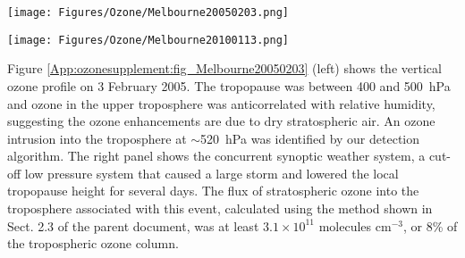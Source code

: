  \begin{figure*}[t]
    \texttt{[image: Figures/Ozone/Melbourne20050203.png]}
    \caption{(Left) Vertical profile of ozone (black), relative humidity (blue), and temperature (red) measured by ozonesonde over Melbourne on 3 February 2005.
      The detected ozone STT event is highlighted in pink.
      Tropopause heights using both the ozone definition (black dashed line) and lapse rate definition (red dashed line) are also shown.
      (Right) Geopotential heights at 500~hPa from the ERA-Interim reanalysis, with wind vectors over-plotted.
      Also shown is the 1~PVU contour line (purple).}
    \label{App:ozonesupplement:fig_Melbourne20050203}
  \end{figure*}
  
  \begin{figure*}[t]
    \texttt{[image: Figures/Ozone/Melbourne20100113.png]}
    \caption{Same as Fig. \ref{App:ozonesupplement:fig_Melbourne20050203} but for 13 January 2010.
      Also shown in this figure is the 2 PVU contour (white), often used to determine dynamical tropopause height.}
    \label{App:ozonesupplement:fig_Melbourne20100113}
  \end{figure*}
  
  Figure \ref{App:ozonesupplement:fig_Melbourne20050203} (left) shows the vertical ozone profile on 3 February 2005.
  The tropopause was between 400 and 500~hPa and ozone in the upper troposphere was anticorrelated with relative humidity, suggesting the ozone enhancements are due to dry stratospheric air. 
  An ozone intrusion into the troposphere at $\sim$520~hPa was identified by our detection algorithm.
  The right panel shows the concurrent synoptic weather system, a cut-off low pressure system that caused a large storm and lowered the local tropopause height for several days.
  The flux of stratospheric ozone into the troposphere associated with this event, calculated using the method shown in Sect. 2.3 of the parent document, was at least $3.1 \times 10^{11}$ molecules cm$^{-3}$, or 8\% of the tropospheric ozone column.
  
